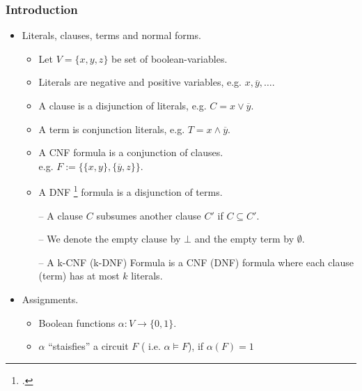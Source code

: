 \documentclass[t,usenames,dvipsnames]{beamer}
\title[space vs. width in resolution]
{Small space in resolution calculus implies small width
\texorpdfstring{\footnote{\tiny Filmus et al., From Small Space to Small Width in Resolution, ACM Trans.
Comput., 2015.}}}
\author{Narek Bojikian} %
\institute[hu-berlin] %
{
Humboldt University of Berlin\\ %
\medskip
\textit{bojikian@informatik.hu-berlin.de} %
}
\date{10.07.2020} %
\begin{document}
\begin{frame}
\titlepage %
\end{frame}
\begin{frame} \frametitle{Introduction}
	\begin{itemize}[<+->]
		\item Literals, clauses, terms and normal forms.
			\begin{itemize}[<+->]
				\item Let $V = \{x, y, z\}$ be set of boolean-variables.
				\item Literals are negative and positive variables,
					\hspace{1cm} e.g. $x, \overline y,\dots$.
				\item A clause is a disjunction of literals,
					\hspace{1cm} e.g. $C = x \lor \overline y$.
				\item A term is conjunction literals,
					\hspace{1cm} e.g. $T = x \land \overline y$.
				\item A CNF formula is a conjunction of clauses.\\
					\hspace{1cm} e.g. $F := \{ \{x, y\}, \{\overline y, z\}\}$.
				\item A DNF
					\footnote{.} formula is a disjunction of terms.\\
				\item[]
				\item[--] A clause $C$ subsumes another clause $C'$ if $C \subseteq C'$.
				\item[--] We denote the empty clause by $\bot$ and the empty term
					by $\emptyset$.
				\item[--] A k-CNF (k-DNF) Formula is a CNF (DNF) formula where each
					clause (term) has at most $k$ literals.
			\end{itemize}
		\item Assignments.
			\begin{itemize}
				\item Boolean functions $\alpha: V \rightarrow \{0, 1\}$.
				\item $\alpha$ ``staisfies'' a circuit $F$ ( i.e. $\alpha \models F$), if
					$\alpha(F) = 1$ 
			\end{itemize}
	\end{itemize}
	
\end{frame}
\end{document}
